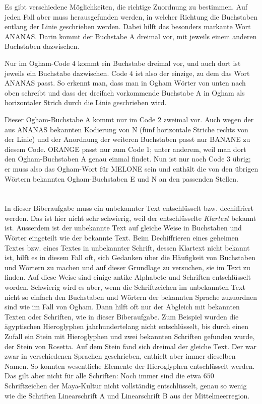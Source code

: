 {{Es gibt verschiedene Möglichkeiten, die richtige Zuordnung zu bestimmen. Auf jeden Fall aber muss herausgefunden werden, in welcher Richtung die Buchstaben entlang der Linie geschrieben werden. Dabei hilft das besonders markante Wort ANANAS. Darin kommt der Buchstabe A dreimal vor, mit jeweils einem anderen Buchstaben dazwischen.

Nur im Ogham-Code $4$ kommt ein Buchstabe dreimal vor, und auch dort ist jeweils ein Buchstabe dazwischen. Code $4$ ist also der einzige, zu dem das Wort ANANAS passt. So erkennt man, dass man in Ogham Wörter von unten nach oben schreibt und dass der dreifach vorkommende Buchstabe A in Ogham als horizontaler Strich durch die Linie geschrieben wird.

Dieser Ogham-Buchstabe A kommt nur im Code $2$ zweimal vor.  Auch wegen der aus ANANAS bekannten Kodierung von N (fünf horizontale Striche rechts von der Linie) und der Anordnung der weiteren Buchstaben passt nur BANANE zu diesem Code. ORANGE passt nur zum Code $1$; unter anderem, weil man dort den Ogham-Buchstaben A genau einmal findet.  Nun ist nur noch Code $3$ übrig; er muss also das Ogham-Wort für MELONE sein und enthält die von den übrigen Wörtern bekannten Ogham-Buchstaben E und N an den passenden Stellen.



\section*{\BrochureItsInformatics}
In dieser Biberaufgabe muss ein unbekannter Text entschlüsselt bzw. dechiffriert werden.  Das ist hier nicht sehr schwierig, weil der entschlüsselte \emph{Klartext} bekannt ist. Ausserdem ist der unbekannte Text auf gleiche Weise in Buchstaben und Wörter eingeteilt wie der bekannte Text. Beim Dechiffrieren eines geheimen Textes bzw. eines Textes in unbekannter Schrift, dessen Klartext nicht bekannt ist, hilft es in diesem Fall oft, sich Gedanken über die Häufigkeit von Buchstaben und Wörtern zu machen und auf dieser Grundlage zu versuchen, sie im Text zu finden. Auf diese Weise sind einige antike Alphabete und Schriften entschlüsselt worden. Schwierig wird es aber, wenn die Schriftzeichen im unbekannten Text nicht so einfach den Buchstaben und Wörtern der bekannten Sprache zuzuordnen sind wie im Fall von Ogham. Dann hilft oft nur der Abgleich mit bekannten Texten oder Schriften, wie in dieser Biberaufgabe. Zum Beispiel wurden die ägyptischen Hieroglyphen jahrhundertelang nicht entschlüsselt, bis durch einen Zufall ein Stein mit Hieroglyphen und zwei bekannten Schriften gefunden wurde, der Stein von Rosetta. Auf dem Stein fand sich dreimal der gleiche Text. Der war zwar in verschiedenen Sprachen geschrieben, enthielt aber immer dieselben Namen. So konnten wesentliche Elemente der Hieroglyphen entschlüsselt werden. Das gilt aber nicht für alle Schriften: Noch immer sind die etwa $650$ Schriftzeichen der Maya-Kultur nicht vollständig entschlüsselt, genau so wenig wie die Schriften Linearschrift A und Linearschrift B aus der Mittelmeerregion.

}}
